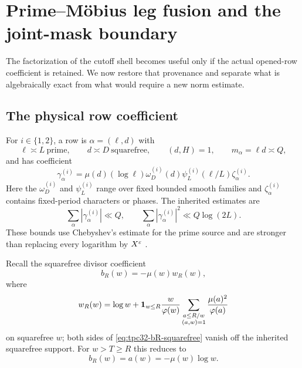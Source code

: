 \section{Prime--M\"obius leg fusion and the joint-mask boundary}
\label{sec:tpc32-prime-mobius}

The factorization of the cutoff shell becomes useful only if the actual
opened-row coefficient is retained.  We now restore that provenance and
separate what is algebraically exact from what would require a new norm
estimate.

\subsection{The physical row coefficient}

For $i\in\{1,2\}$, a row is $\alpha=(\ell,d)$ with
\begin{equation}
 \ell\asymp L\ \text{prime},
 \qquad
 d\asymp D\ \text{squarefree},
 \qquad
 (d,H)=1,
 \qquad
 m_\alpha=\ell d\asymp Q,
 \label{eq:tpc32-row-provenance-fusion}
\end{equation}
and has coefficient
\begin{equation}
 \gamma_\alpha^{(i)}
 =\mu(d)(\log\ell)\omega_D^{(i)}(d)
   \psi_L^{(i)}(\ell/L)\zeta_\alpha^{(i)}.
 \label{eq:tpc32-gamma}
\end{equation}
Here the $\omega_D^{(i)}$ and $\psi_L^{(i)}$ range over fixed bounded
smooth families and $\zeta_\alpha^{(i)}$ contains fixed-period characters
or phases.  The inherited estimates are
\begin{equation}
 \sum_\alpha|\gamma_\alpha^{(i)}|\ll Q,
 \qquad
 \sum_\alpha|\gamma_\alpha^{(i)}|^2\ll Q\log(2L).
 \label{eq:tpc32-row-masses}
\end{equation}
These bounds use Chebyshev's estimate for the prime source and are stronger
than replacing every logarithm by $X^\varepsilon$ \citep{WangTPC25}.

Recall the squarefree divisor coefficient
\begin{equation}
 b_R(w)=-\mu(w)w_R(w),
 \label{eq:tpc32-bR-squarefree}
\end{equation}
where
\begin{equation}
 w_R(w)=\log w+\mathbf 1_{w\le R}\frac{w}{\varphi(w)}
 \sum_{\substack{a\le R/w\\(a,w)=1}}
 \frac{\mu(a)^2}{\varphi(a)}
 \label{eq:tpc32-wR-fusion}
\end{equation}
on squarefree $w$; both sides of \eqref{eq:tpc32-bR-squarefree} vanish off
the inherited squarefree support.  For $w>T\ge R$ this reduces to
\begin{equation}
 b_R(w)=a(w)=-\mu(w)\log w.
 \label{eq:tpc32-ultra-a}
\end{equation}

